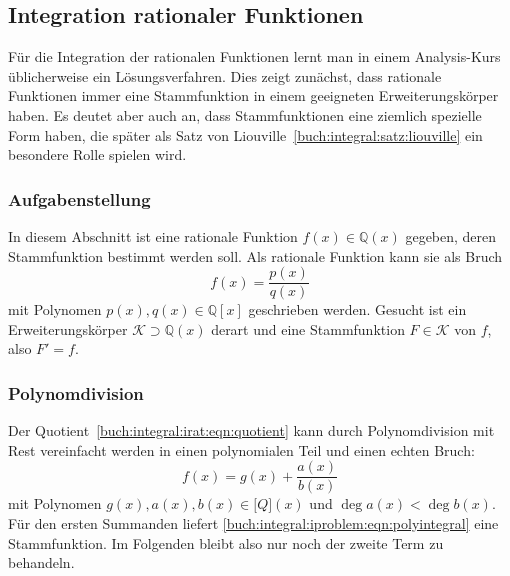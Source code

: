 %
%
%
\subsection{Integration rationaler Funktionen
\label{buch:integral:subsection:rationalefunktionen}}
Für die Integration der rationalen Funktionen lernt man in einem
Analysis-Kurs üblicherweise ein Lösungsverfahren.
Dies zeigt zunächst, dass rationale Funktionen immer eine Stammfunktion
in einem geeigneten Erweiterungskörper haben.
Es deutet aber auch an, dass Stammfunktionen eine ziemlich spezielle
Form haben, die später als
Satz von Liouville~\ref{buch:integral:satz:liouville}
ein besondere Rolle spielen wird.

%
%
\subsubsection{Aufgabenstellung}
In diesem Abschnitt ist eine rationale Funktion $f(x)\in\mathbb{Q}(x)$
gegeben, deren Stammfunktion bestimmt werden soll.
Als rationale Funktion kann sie als Bruch
\begin{equation}
f(x) = \frac{p(x)}{q(x)}
\label{buch:integral:irat:eqn:quotient}
\end{equation}
mit Polynomen $p(x),q(x)\in\mathbb{Q}[x]$ geschrieben werden.
Gesucht ist ein Erweiterungskörper $\mathscr{K}\supset \mathbb{Q}(x)$ 
derart und eine Stammfunktion $F\in\mathscr{K}$ von $f$, also $F'=f$.

%
%
\subsubsection{Polynomdivision}
Der Quotient~\eqref{buch:integral:irat:eqn:quotient} kann durch Polynomdivision
mit Rest vereinfacht werden in einen polynomialen Teil und einen echten
Bruch:
\begin{equation}
f(x)
=
g(x)
+
\frac{a(x)}{b(x)}
\label{buch:integral:irat:eqn:polydiv}
\end{equation}
mit Polynomen $g(x),a(x),b(x)\in\mathbb[Q](x)$ und $\deg a(x) < \deg b(x)$.
Für den ersten Summanden liefert
\eqref{buch:integral:iproblem:eqn:polyintegral} eine Stammfunktion.
Im Folgenden bleibt also nur noch der zweite Term zu behandeln.

%
%
